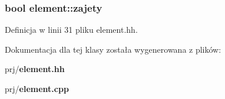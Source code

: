 \subsubsection[{zajety}]{\setlength{\rightskip}{0pt plus 5cm}bool {\bf element\-::zajety}}\label{classelement_ab8931aa65d177c803287d93e49b14db9}


\-Definicja w linii 31 pliku element.\-hh.



\-Dokumentacja dla tej klasy została wygenerowana z plików\-:\begin{DoxyCompactItemize}
\item 
prj/{\bf element.\-hh}\item 
prj/{\bf element.\-cpp}\end{DoxyCompactItemize}
